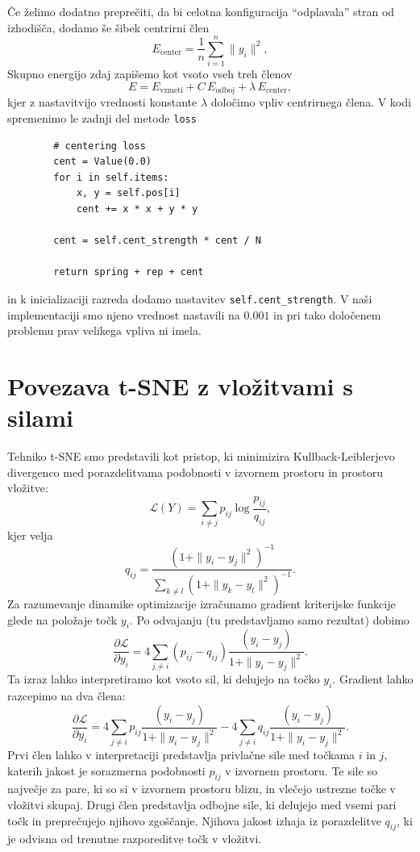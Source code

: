 Če želimo dodatno preprečiti, da bi celotna konfiguracija ``odplavala'' stran od izhodišča, dodamo še šibek centrirni člen
\[
E_{\text{center}} = \frac{1}{n} \sum_{i=1}^n \|y_i\|^2,
\]
Skupno energijo zdaj zapišemo kot vsoto vseh treh členov
\[
E = E_{\text{vzmeti}} + C\,E_{\text{odboj}} + \lambda\,E_{\text{center}},
\]
kjer z nastavitvijo vrednosti konstante $\lambda$ določimo vpliv centrirnega člena. V kodi spremenimo le zadnji del metode \texttt{loss}
\vspace*{3mm}
\begin{lstlisting}
        # centering loss
        cent = Value(0.0)
        for i in self.items:
            x, y = self.pos[i]
            cent += x * x + y * y

        cent = self.cent_strength * cent / N

        return spring + rep + cent
\end{lstlisting}
in k inicializaciji razreda dodamo nastavitev \texttt{self.cent\_strength}. V naši implementaciji smo njeno vrednost nastavili na $0.001$ in pri tako določenem problemu prav velikega vpliva ni imela.

\section{Povezava t-SNE z vložitvami s silami}

Tehniko t-SNE smo predstavili kot pristop, ki minimizira Kullback-Leiblerjevo divergenco med porazdelitvama podobnosti v izvornem prostoru in prostoru vložitve:
\[
\mathcal{L}(Y) = \sum_{i \ne j} p_{ij} \log \frac{p_{ij}}{q_{ij}},
\]
kjer velja
\[
q_{ij} = \frac{(1 + \|y_i - y_j\|^2)^{-1}}{\sum_{k \ne l} (1 + \|y_k - y_l\|^2)^{-1}}.
\]
Za razumevanje dinamike optimizacije izračunamo gradient kriterijske funkcije glede na položaje točk \( y_i \). Po odvajanju (tu predstavljamo samo rezultat) dobimo
\[
\frac{\partial \mathcal{L}}{\partial y_i}
=
4 \sum_{j \ne i}
(p_{ij} - q_{ij})
\frac{(y_i - y_j)}{1 + \|y_i - y_j\|^2}.
\]
Ta izraz lahko interpretiramo kot vsoto sil, ki delujejo na točko \( y_i \). Gradient lahko razcepimo na dva člena:
\[
\frac{\partial \mathcal{L}}{\partial y_i}
=
4 \sum_{j \ne i}
p_{ij} \frac{(y_i - y_j)}{1 + \|y_i - y_j\|^2}
-
4 \sum_{j \ne i}
q_{ij} \frac{(y_i - y_j)}{1 + \|y_i - y_j\|^2}.
\]
Prvi člen lahko v interpretaciji predstavlja privlačne sile med točkama \( i \) in \( j \), katerih jakost je sorazmerna podobnosti \( p_{ij} \) v izvornem prostoru. Te sile so največje za pare, ki so si v izvornem prostoru blizu, in vlečejo ustrezne točke v vložitvi skupaj. Drugi člen predstavlja odbojne sile, ki delujejo med vsemi pari točk in preprečujejo njihovo zgoščanje. Njihova jakost izhaja iz porazdelitve \( q_{ij} \), ki je odvisna od trenutne razporeditve točk v vložitvi.

